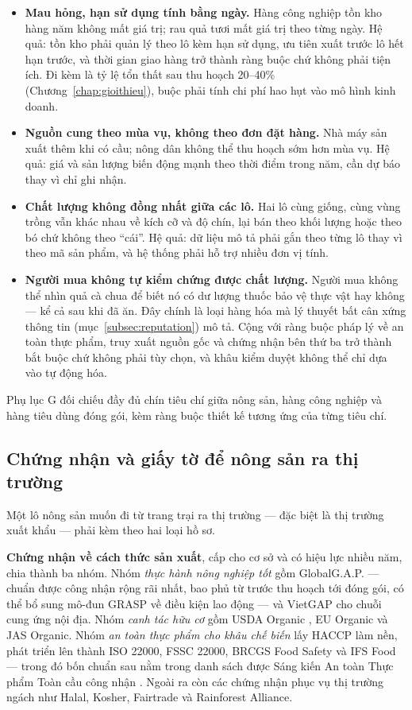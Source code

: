 \begin{itemize}
    \item \textbf{Mau hỏng, hạn sử dụng tính bằng ngày.} Hàng công nghiệp tồn kho hàng năm không mất giá trị; rau quả tươi mất giá trị theo từng ngày. Hệ quả: tồn kho phải quản lý theo lô kèm hạn sử dụng, ưu tiên xuất trước lô hết hạn trước, và thời gian giao hàng trở thành ràng buộc chứ không phải tiện ích. Đi kèm là tỷ lệ tổn thất sau thu hoạch 20--40\% (Chương~\ref{chap:gioithieu}), buộc phải tính chi phí hao hụt vào mô hình kinh doanh.
    \item \textbf{Nguồn cung theo mùa vụ, không theo đơn đặt hàng.} Nhà máy sản xuất thêm khi có cầu; nông dân không thể thu hoạch sớm hơn mùa vụ. Hệ quả: giá và sản lượng biến động mạnh theo thời điểm trong năm, cần dự báo thay vì chỉ ghi nhận.
    \item \textbf{Chất lượng không đồng nhất giữa các lô.} Hai lô cùng giống, cùng vùng trồng vẫn khác nhau về kích cỡ và độ chín, lại bán theo khối lượng hoặc theo bó chứ không theo ``cái''. Hệ quả: dữ liệu mô tả phải gắn theo từng lô thay vì theo mã sản phẩm, và hệ thống phải hỗ trợ nhiều đơn vị tính.
    \item \textbf{Người mua không tự kiểm chứng được chất lượng.} Người mua không thể nhìn quả cà chua để biết nó có dư lượng thuốc bảo vệ thực vật hay không --- kể cả sau khi đã ăn. Đây chính là loại hàng hóa mà lý thuyết bất cân xứng thông tin (mục~\ref{subsec:reputation}) mô tả. Cộng với ràng buộc pháp lý về an toàn thực phẩm, truy xuất nguồn gốc và chứng nhận bên thứ ba trở thành bắt buộc chứ không phải tùy chọn, và khâu kiểm duyệt không thể chỉ dựa vào tự động hóa.
\end{itemize}

Phụ lục G đối chiếu đầy đủ chín tiêu chí giữa nông sản, hàng công nghiệp và hàng tiêu dùng đóng gói, kèm ràng buộc thiết kế tương ứng của từng tiêu chí.

\subsection{Chứng nhận và giấy tờ để nông sản ra thị trường}
\label{subsec:chungnhan}

Một lô nông sản muốn đi từ trang trại ra thị trường --- đặc biệt là thị trường xuất khẩu --- phải kèm theo hai loại hồ sơ.

\noindent\textbf{Chứng nhận về cách thức sản xuất}, cấp cho cơ sở và có hiệu lực nhiều năm, chia thành ba nhóm. Nhóm \emph{thực hành nông nghiệp tốt} gồm GlobalG.A.P. --- chuẩn được công nhận rộng rãi nhất, bao phủ từ trước thu hoạch tới đóng gói, có thể bổ sung mô-đun GRASP về điều kiện lao động \parencite{globalgap_ifa} --- và VietGAP cho chuỗi cung ứng nội địa. Nhóm \emph{canh tác hữu cơ} gồm USDA Organic \parencite{usda_nop}, EU Organic \parencite{eu_organic_2018848} và JAS Organic. Nhóm \emph{an toàn thực phẩm cho khâu chế biến} lấy HACCP làm nền, phát triển lên thành ISO 22000, FSSC 22000, BRCGS Food Safety và IFS Food --- trong đó bốn chuẩn sau nằm trong danh sách được Sáng kiến An toàn Thực phẩm Toàn cầu công nhận \parencite{gfsi_cpo}. Ngoài ra còn các chứng nhận phục vụ thị trường ngách như Halal, Kosher, Fairtrade và Rainforest Alliance.

